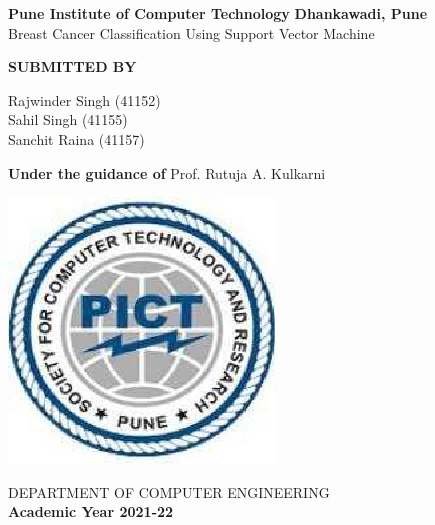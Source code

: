 \documentclass[a4paper, 12pt, fleqn]{article}
\begin{document}
 
\begin{titlepage}
    \begin{center}
        \vspace*{1cm}
        \par
        \large
                \textbf{Pune Institute of Computer Technology}	
                \linebreak
		\textbf{Dhankawadi, Pune}
        \vspace{0.5cm}
        \linebreak
        \vspace{0.5cm}
        \large
        \\Breast Cancer Classification
        Using Support Vector
        Machine 
        \linebreak
        \linebreak
		
		\textbf{SUBMITTED BY}
		\vspace{1cm}
		
         Rajwinder Singh (41152) \\
         Sahil Singh (41155) \\
         Sanchit Raina (41157)
        \linebreak
        \linebreak
		        
        \textbf{\large{Under the guidance of}}
		\linebreak
	    Prof. Rutuja A. Kulkarni
		\linebreak
        
        
        
        \vspace{0.8cm}
        

        \includegraphics[scale=0.6]{pict}   
        
        \Large
        DEPARTMENT OF COMPUTER ENGINEERING\\
		\textbf{Academic Year 2021-22}
        
    \end{center}
\end{titlepage}
\pagebreak
\end{document}
